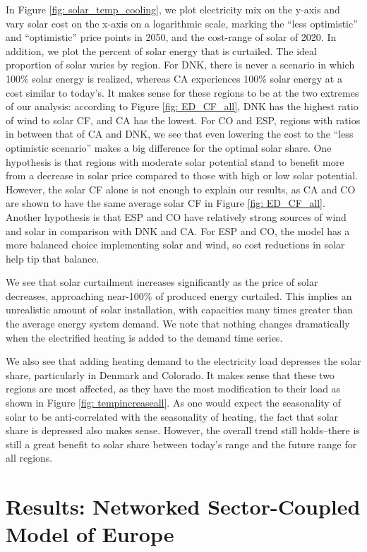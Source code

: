 \documentclass[lettersize,journal]{IEEEtran}
\begin{document}
In Figure \ref{fig: solar_temp_cooling}, we plot electricity mix on the y-axis and vary solar cost on the x-axis on a logarithmic scale, marking the “less optimistic” and “optimistic” price points in 2050, and the cost-range of solar of 2020. In addition, we plot the percent of solar energy that is curtailed. The ideal proportion of solar varies by region. For DNK, there is never a scenario in which 100\% solar energy is realized, whereas CA experiences 100\% solar energy at a cost similar to today's.  It makes sense for these regions to be at the two extremes of our analysis: according to Figure \ref{fig: ED_CF_all}, DNK has the highest ratio of wind to solar CF, and CA has the lowest. For CO and ESP, regions with ratios in between that of CA and DNK, we see that even lowering the cost to the “less optimistic scenario” makes a big difference for the optimal solar share. One hypothesis is that regions with moderate solar potential stand to benefit more from a decrease in solar price compared to those with high or low solar potential. However, the solar CF alone is not enough to explain our results, as CA and CO are shown to have the same average solar CF in Figure \ref{fig: ED_CF_all}.  Another hypothesis is that ESP and CO have relatively strong sources of wind and solar in comparison with DNK and CA. For ESP and CO, the model has a more balanced choice implementing solar and wind, so cost reductions in solar help tip that balance. 

We see that solar curtailment increases significantly as the price of solar decreases, approaching near-100\% of produced energy curtailed. This implies an unrealistic amount of solar installation, with capacities many times greater than the average energy system demand. We note that nothing changes dramatically when the electrified heating is added to the demand time series.

We also see that adding heating demand to the electricity load depresses the solar share, particularly in Denmark and Colorado. It makes sense that these two regions are most affected, as they have the most modification to their load as shown in Figure \ref{fig: tempincreaseall}. As one would expect the seasonality of solar to be anti-correlated with the seasonality of heating, the fact that solar share is depressed also makes sense. However, the overall trend still holds--there is still a great benefit to solar share between today's range and the future range for all regions.

\section{Results: Networked Sector-Coupled Model of Europe}
\end{document}
